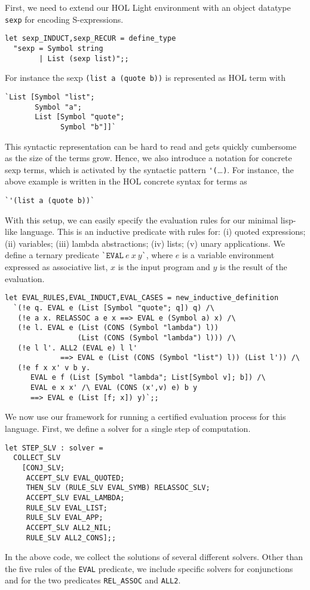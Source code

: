 First, we need to extend our HOL Light environment with an object
datatype \verb|sexp| for encoding S-expressions.
\begin{verbatim}
let sexp_INDUCT,sexp_RECUR = define_type
  "sexp = Symbol string
        | List (sexp list)";;
\end{verbatim}
For instance the sexp \verb|(list a (quote b))| is represented as HOL
term with
\begin{verbatim}
`List [Symbol "list";
       Symbol "a";
       List [Symbol "quote";
             Symbol "b"]]`
\end{verbatim}
This syntactic representation can be hard to read and gets quickly
cumbersome as the size of the terms grow.  Hence, we also introduce a
notation for concrete sexp terms, which is activated by the syntactic
pattern \verb|'(|\ldots\verb|)|.  For instance, the above example
is written in the HOL concrete syntax for terms as
\begin{verbatim}
`'(list a (quote b))`
\end{verbatim}

With this setup, we can easily specify the evaluation rules for our
minimal lisp-like language.  This is an inductive predicate with rules
for: (i) quoted expressions; (ii) variables; (iii) lambda
abstractions; (iv) lists; (v) unary applications.  We define a ternary
predicate \verb|`|$\mathtt{EVAL}\ e\ x\ y\mathtt{}$\verb|`|, where $e$
is a variable environment expressed as associative list, $x$ is the
input program and $y$ is the result of the evaluation.
\begin{verbatim}
let EVAL_RULES,EVAL_INDUCT,EVAL_CASES = new_inductive_definition
  `(!e q. EVAL e (List [Symbol "quote"; q]) q) /\
   (!e a x. RELASSOC a e x ==> EVAL e (Symbol a) x) /\
   (!e l. EVAL e (List (CONS (Symbol "lambda") l))
                 (List (CONS (Symbol "lambda") l))) /\
   (!e l l'. ALL2 (EVAL e) l l'
             ==> EVAL e (List (CONS (Symbol "list") l)) (List l')) /\
   (!e f x x' v b y.
      EVAL e f (List [Symbol "lambda"; List[Symbol v]; b]) /\
      EVAL e x x' /\ EVAL (CONS (x',v) e) b y
      ==> EVAL e (List [f; x]) y)`;;
\end{verbatim}

We now use our framework for running a certified evaluation process
for this language.  First, we define a solver for a single step of
computation.
\begin{verbatim}
let STEP_SLV : solver =
  COLLECT_SLV
    [CONJ_SLV;
     ACCEPT_SLV EVAL_QUOTED;
     THEN_SLV (RULE_SLV EVAL_SYMB) RELASSOC_SLV;
     ACCEPT_SLV EVAL_LAMBDA;
     RULE_SLV EVAL_LIST;
     RULE_SLV EVAL_APP;
     ACCEPT_SLV ALL2_NIL;
     RULE_SLV ALL2_CONS];;
\end{verbatim}
In the above code, we collect the solutions of several different
solvers.  Other than the five rules of the \verb|EVAL| predicate, we
include specific solvers for conjunctions and for the two predicates
\verb|REL_ASSOC| and \verb|ALL2|.

